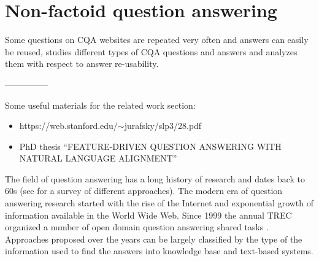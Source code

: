 \section{Non-factoid question answering}

Some questions on CQA websites are repeated very often and answers can easily be reused, \cite{Liu:2008:USA:1599081.1599144} studies different types of CQA questions and answers and analyzes them with respect to answer re-usability.



---------------
\clearpage

Some useful materials for the related work section:
\begin{itemize}
\item https://web.stanford.edu/$\sim$jurafsky/slp3/28.pdf
\item PhD thesis ``FEATURE-DRIVEN QUESTION ANSWERING WITH NATURAL LANGUAGE ALIGNMENT''
\end{itemize}




The field of question answering has a long history of research and dates back to 60s (see \cite{Kolomiyets:2011:SQA:2046840.2047162} for a survey of different approaches).
The modern era of question answering research started with the rise of the Internet and exponential growth of information available in the World Wide Web.
Since 1999 the annual TREC organized a number of open domain question answering shared tasks \cite{dang2007overview}.
Approaches proposed over the years can be largely classified by the type of the information used to find the answers into knowledge base and text-based systems.

